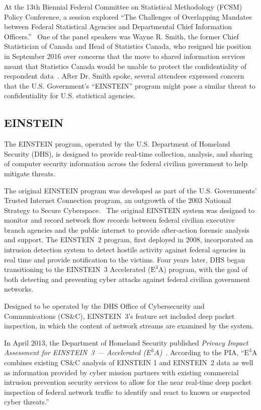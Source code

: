 \documentclass[fleqn,10pt]{wlscirep}
\newcommand{\ETA}{$\textrm{E}^\textrm{3}\textrm{A}$\xspace}
\begin{document}
At the 13th Biennial Federal Committee on Statistical Methodology
(FCSM) Policy Conference, a session explored ``The Challenges of
Overlapping Mandates between Federal Statistical Agencies and
Departmental Chief Information Officers.''~\cite{fcsm-program} One of
the panel speakers was Wayne R. Smith, the former Chief Statistician
of Canada and Head of Statistics Canada, who resigned his position in
September 2016 over concerns that the move to shared information services
meant that Statistics Canada would be unable to
protect the confidentiality of respondent
data~\cite{ottawacitizen}. After Dr. Smith spoke, several attendees
expressed concern that the U.S. Government's ``EINSTEIN'' program
might pose a similar threat to confidentiality for U.S. statistical agencies. 

\subsection{EINSTEIN}

The EINSTEIN program, operated by the U.S. Department of Homeland
Security (DHS), is designed to provide real-time collection,
analysis, and sharing of computer security information across the
federal civilian government to help mitigate threats.~\cite{dhs-einstein-2004}

The original EINSTEIN program was developed as part of the U.S.
Governments' Trusted Internet Connection program, an outgrowth of the
2003 National Strategy to Secure Cyberspace.~\cite{nstsc-2003}
The original EINSTEIN system was designed to
monitor and record network flow records between federal civilian executive branch
agencies and the public internet to provide after-action forensic analysis and support. The
EINSTEIN~2 program, first deployed in 2008, incorporated an intrusion
detection system to detect hostile activity against federal agencies
in real time and provide notification to the victims. Four years later, DHS began
transitioning to the EINSTEIN~3 Accelerated (\ETA) program, with the
goal of both detecting and preventing cyber attacks against federal
civilian government networks.~\cite{dhs-einstein}

Designed to be operated by the DHS Office of Cybersecurity and
Communications (CS\&C), EINSTEIN~3's feature set included deep packet
inspection, in which the content of network streams are examined by
the system. 

In April 2013, the Department of Homeland Security published 
\emph{Privacy Impact Assessment for EINSTEIN~3 --- Accelerated
  ($E^3A$)}~\cite{dhs-e3a-pia}. According to the PIA, ``\ETA combines
existing CS\&C analysis of EINSTEIN 1 and EINSTEIN~2 data as well as
information provided by cyber mission partners with existing
commercial intrusion prevention security services to allow for the
near real-time deep packet inspection of federal network traffic to
identify and react to known or suspected cyber threats.''~\cite[p.4]{dhs-e3a-pia}
\end{document}
